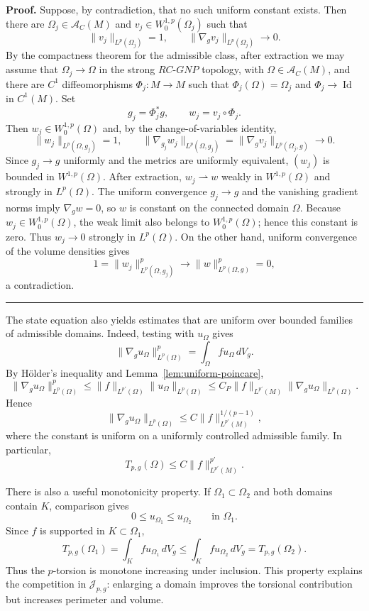 \documentclass{article}
\newenvironment{proof}[1][Proof]{\textbf{#1.} }{\hfill\rule{0.5em}{0.5em}}
\begin{document}
\begin{proof}
Suppose, by contradiction, that no such uniform constant exists. Then there
are $\Omega_j\in\mathcal A_C(M)$ and $v_j\in W_0^{1,p}(\Omega_j)$ such that
\[
\|v_j\|_{L^p(\Omega_j)}=1,
\qquad
\|\nabla_g v_j\|_{L^p(\Omega_j)}\longrightarrow0.
\]
By the compactness theorem for the admissible class, after extraction we may
assume that $\Omega_j\to\Omega$ in the strong $RC$-$GNP$ topology, with
$\Omega\in\mathcal A_C(M)$, and there are $C^1$ diffeomorphisms
$\Phi_j:M\to M$ such that $\Phi_j(\Omega)=\Omega_j$ and
$\Phi_j\to\operatorname{Id}$ in $C^1(M)$. Set
\[
g_j=\Phi_j^*g,
\qquad
w_j=v_j\circ\Phi_j.
\]
Then $w_j\in W_0^{1,p}(\Omega)$ and, by the change-of-variables identity,
\[
\|w_j\|_{L^p(\Omega,g_j)}=1,
\qquad
\|\nabla_{g_j}w_j\|_{L^p(\Omega,g_j)}
=\|\nabla_gv_j\|_{L^p(\Omega_j,g)}\longrightarrow0.
\]
Since $g_j\to g$ uniformly and the metrics are uniformly equivalent, $(w_j)$
is bounded in $W^{1,p}(\Omega)$. After extraction, $w_j\rightharpoonup w$
weakly in $W^{1,p}(\Omega)$ and strongly in $L^p(\Omega)$. The uniform
convergence $g_j\to g$ and the vanishing gradient norms imply
$\nabla_gw=0$, so $w$ is constant on the connected domain $\Omega$.
Because $w_j\in W_0^{1,p}(\Omega)$, the weak limit also belongs to
$W_0^{1,p}(\Omega)$; hence this constant is zero. Thus
$w_j\to0$ strongly in $L^p(\Omega)$.
On the other hand, uniform convergence of the volume densities gives
\[
1=\|w_j\|_{L^p(\Omega,g_j)}^p
\longrightarrow \|w\|_{L^p(\Omega,g)}^p=0,
\]
a contradiction.\end{proof}


The state equation also yields estimates that are uniform over bounded
families of admissible domains. Indeed, testing with $u_\Omega$ gives
\[
\|\nabla_g u_\Omega\|_{L^p(\Omega)}^p
=\int_\Omega fu_\Omega\,dV_g.
\]
By Hölder's inequality and Lemma~\ref{lem:uniform-poincare},
\[
\|\nabla_g u_\Omega\|_{L^p(\Omega)}^p
\leq
\|f\|_{L^{p'}(\Omega)}
\|u_\Omega\|_{L^p(\Omega)}
\leq
C_P\|f\|_{L^{p'}(M)}
\|\nabla_g u_\Omega\|_{L^p(\Omega)}.
\]
Hence
\[
\|\nabla_g u_\Omega\|_{L^p(\Omega)}
\leq
C\|f\|_{L^{p'}(M)}^{1/(p-1)},
\]
where the constant is uniform on a uniformly controlled admissible
family. In particular,
\[
T_{p,g}(\Omega)
\leq
C\|f\|_{L^{p'}(M)}^{p'}.
\]

There is also a useful monotonicity property. If
$\Omega_1\subset\Omega_2$ and both domains contain $K$, comparison gives
\[
0\leq u_{\Omega_1}\leq u_{\Omega_2}
\qquad\text{in }\Omega_1.
\]
Since $f$ is supported in $K\subset\Omega_1$,
\[
T_{p,g}(\Omega_1)
=\int_Kfu_{\Omega_1}\,dV_g
\leq
\int_Kfu_{\Omega_2}\,dV_g
=T_{p,g}(\Omega_2).
\]
Thus the $p$-torsion is monotone increasing under inclusion. This
property explains the competition in $\mathcal J_{p,g}$: enlarging a
domain improves the torsional contribution but increases perimeter and
volume.
\end{document}
